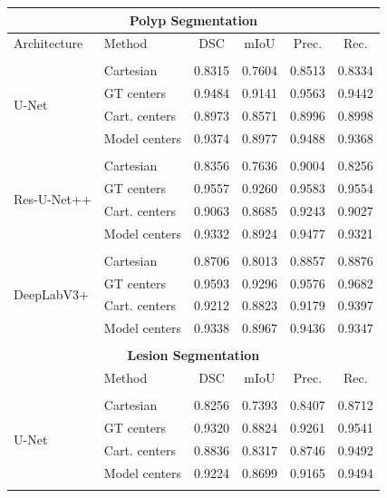\begin{table}
\centering
\def\arraystretch{1.2}
\begin{tabularx}{\textwidth}{X X c c c c} 
 \\ [-2ex]

 \multicolumn{6}{c}{\textbf{Polyp Segmentation}}\\[1ex]
 \hline
 Architecture & Method & DSC & mIoU & Prec. & Rec. \\ 
 \hline \\ [-1.5ex]
 
 \multirow{4}{7em}{{U-Net}}
& Cartesian & 0.8315 & 0.7604 & 0.8513 & 0.8334 \\
& GT centers & 0.9484 & 0.9141 & 0.9563 & 0.9442 \\
& Cart. centers & 0.8973 & 0.8571 & 0.8996 & 0.8998 \\
& Model centers & 0.9374 & 0.8977 & 0.9488 & 0.9368 \\ [1ex]
\hline \\ [-1.5ex]

 \multirow{4}{7em}{{Res-U-Net++}}
& Cartesian & 0.8356 & 0.7636 & 0.9004 & 0.8256 \\
& GT centers & 0.9557 & 0.9260 & 0.9583 & 0.9554 \\
& Cart. centers & 0.9063 & 0.8685 & 0.9243 & 0.9027 \\
& Model centers & 0.9332 & 0.8924 & 0.9477 & 0.9321 \\ [1ex]
\hline \\ [-1.5ex]

 \multirow{4}{7em}{{DeepLabV3+}}
& Cartesian & 0.8706 & 0.8013 & 0.8857 & 0.8876 \\
& GT centers & 0.9593 & 0.9296 & 0.9576 & 0.9682 \\
& Cart. centers & 0.9212 & 0.8823 & 0.9179 & 0.9397 \\
& Model centers & 0.9338 & 0.8967 & 0.9436 & 0.9347 \\ [1ex]
\hline \\ [-1.5ex]

\multicolumn{6}{c}{\textbf{Lesion Segmentation}}\\[1ex]
 \hline
  & Method & DSC & mIoU & Prec. & Rec. \\ 
 \hline \\ [-1.5ex]
 
 \multirow{4}{7em}{{U-Net}}
& Cartesian & 0.8256 & 0.7393 & 0.8407 & 0.8712 \\
& GT centers & 0.9320 & 0.8824 & 0.9261 & 0.9541 \\
& Cart. centers & 0.8836 & 0.8317 & 0.8746 & 0.9492 \\
& Model centers & 0.9224 & 0.8699 & 0.9165 & 0.9494 \\ [1ex]
\hline \\ [-1.5ex]


\end{tabularx}
\end{table}
